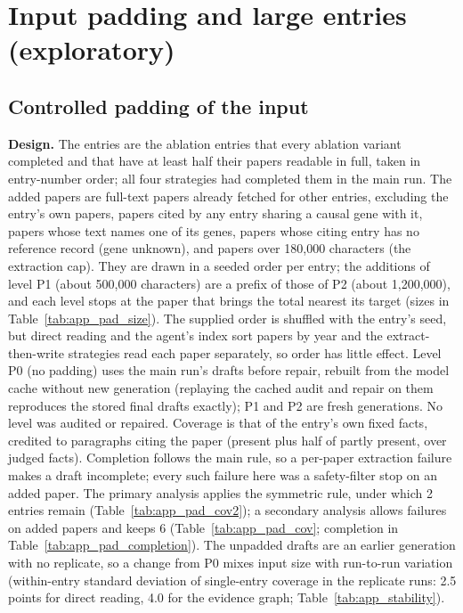 \documentclass{article} %
\begin{document}
\FloatBarrier
\FloatBarrier
\section{Input padding and large entries (exploratory)}
\label{app:padding}
\subsection{Controlled padding of the input}
\textbf{Design.} The entries are the ablation entries that every ablation variant completed and that have at least half their papers readable in full, taken in entry-number order; all four strategies had completed them in the main run. The added papers are full-text papers already fetched for other entries, excluding the entry's own papers, papers cited by any entry sharing a causal gene with it, papers whose text names one of its genes, papers whose citing entry has no reference record (gene unknown), and papers over 180,000 characters (the extraction cap). They are drawn in a seeded order per entry; the additions of level P1 (about 500,000 characters) are a prefix of those of P2 (about 1,200,000), and each level stops at the paper that brings the total nearest its target (sizes in Table~\ref{tab:app_pad_size}). The supplied order is shuffled with the entry's seed, but direct reading and the agent's index sort papers by year and the extract-then-write strategies read each paper separately, so order has little effect. Level P0 (no padding) uses the main run's drafts before repair, rebuilt from the model cache without new generation (replaying the cached audit and repair on them reproduces the stored final drafts exactly); P1 and P2 are fresh generations. No level was audited or repaired. Coverage is that of the entry's own fixed facts, credited to paragraphs citing the paper (present plus half of partly present, over judged facts). Completion follows the main rule, so a per-paper extraction failure makes a draft incomplete; every such failure here was a safety-filter stop on an added paper. The primary analysis applies the symmetric rule, under which 2 entries remain (Table~\ref{tab:app_pad_cov2}); a secondary analysis allows failures on added papers and keeps 6 (Table~\ref{tab:app_pad_cov}; completion in Table~\ref{tab:app_pad_completion}). The unpadded drafts are an earlier generation with no replicate, so a change from P0 mixes input size with run-to-run variation (within-entry standard deviation of single-entry coverage in the replicate runs: 2.5 points for direct reading, 4.0 for the evidence graph; Table~\ref{tab:app_stability}).
\end{document}
